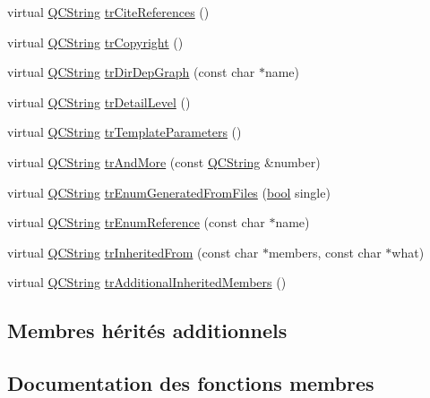 \begin{DoxyCompactItemize}
\item 
virtual \hyperlink{class_q_c_string}{Q\+C\+String} \hyperlink{class_translator_italian_a85919834b6b72e9dd99543dd396172dd}{tr\+Cite\+References} ()
\item 
virtual \hyperlink{class_q_c_string}{Q\+C\+String} \hyperlink{class_translator_italian_ae256a7ad876bde0aef55eaaabcc6d794}{tr\+Copyright} ()
\item 
virtual \hyperlink{class_q_c_string}{Q\+C\+String} \hyperlink{class_translator_italian_aec757bee06a313f82e17748fa0c72cb2}{tr\+Dir\+Dep\+Graph} (const char $\ast$name)
\item 
virtual \hyperlink{class_q_c_string}{Q\+C\+String} \hyperlink{class_translator_italian_ac0e1e2c20e38faf820b45b09e589625f}{tr\+Detail\+Level} ()
\item 
virtual \hyperlink{class_q_c_string}{Q\+C\+String} \hyperlink{class_translator_italian_a9cb99a813d2e67651e723be6065e3190}{tr\+Template\+Parameters} ()
\item 
virtual \hyperlink{class_q_c_string}{Q\+C\+String} \hyperlink{class_translator_italian_a776e83ad4d9ba9d59696dd9256b4b1b8}{tr\+And\+More} (const \hyperlink{class_q_c_string}{Q\+C\+String} \&number)
\item 
virtual \hyperlink{class_q_c_string}{Q\+C\+String} \hyperlink{class_translator_italian_ad35aa813efa08328798c0370df1243d0}{tr\+Enum\+Generated\+From\+Files} (\hyperlink{qglobal_8h_a1062901a7428fdd9c7f180f5e01ea056}{bool} single)
\item 
virtual \hyperlink{class_q_c_string}{Q\+C\+String} \hyperlink{class_translator_italian_a861e5aa87281c24e9d65e69734901e8d}{tr\+Enum\+Reference} (const char $\ast$name)
\item 
virtual \hyperlink{class_q_c_string}{Q\+C\+String} \hyperlink{class_translator_italian_a1273a94f19d2d30d84f5ca52022bea84}{tr\+Inherited\+From} (const char $\ast$members, const char $\ast$what)
\item 
virtual \hyperlink{class_q_c_string}{Q\+C\+String} \hyperlink{class_translator_italian_a82f2eeea8a3292c31ed0c3fa6fea4f3c}{tr\+Additional\+Inherited\+Members} ()
\end{DoxyCompactItemize}
\subsection*{Membres hérités additionnels}


\subsection{Documentation des fonctions membres}
\hypertarget{class_translator_italian_a03fa97515ddfa1510cafc3a6070bd798}{}
